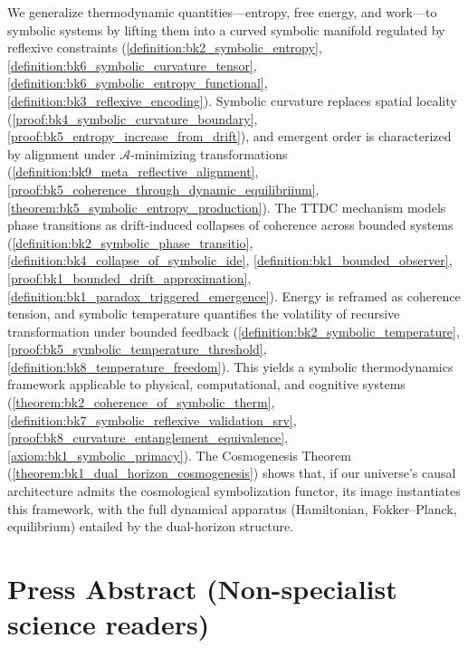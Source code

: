 We generalize thermodynamic quantities—entropy, free energy, and work—to symbolic systems by lifting them into a curved symbolic manifold regulated by reflexive constraints (\ref{definition:bk2_symbolic_entropy}, \ref{definition:bk6_symbolic_curvature_tensor}, \ref{definition:bk6_symbolic_entropy_functional}, \ref{definition:bk3_reflexive_encoding}). Symbolic curvature replaces spatial locality (\ref{proof:bk4_symbolic_curvature_boundary}, \ref{proof:bk5_entropy_increase_from_drift}), and emergent order is characterized by alignment under $\mathcal{A}$-minimizing transformations (\ref{definition:bk9_meta_reflective_alignment}, \ref{proof:bk5_coherence_through_dynamic_equilibriium}, \ref{theorem:bk5_symbolic_entropy_production}). The TTDC mechanism models phase transitions as drift-induced collapses of coherence across bounded systems (\ref{definition:bk2_symbolic_phase_transitio}, \ref{definition:bk4_collapse_of_symbolic_ide}, \ref{definition:bk1_bounded_observer}, \ref{proof:bk1_bounded_drift_approximation}, \ref{definition:bk1_paradox_triggered_emergence}). Energy is reframed as coherence tension, and symbolic temperature quantifies the volatility of recursive transformation under bounded feedback (\ref{definition:bk2_symbolic_temperature}, \ref{proof:bk5_symbolic_temperature_threshold}, \ref{definition:bk8_temperature_freedom}). This yields a symbolic thermodynamics framework applicable to physical, computational, and cognitive systems (\ref{theorem:bk2_coherence_of_symbolic_therm}, \ref{definition:bk7_symbolic_reflexive_validation_srv}, \ref{proof:bk8_curvature_entanglement_equivalence}, \ref{axiom:bk1_symbolic_primacy}). The Cosmogenesis Theorem (\ref{theorem:bk1_dual_horizon_cosmogenesis}) shows that, if our universe's causal architecture admits the cosmological symbolization functor, its image instantiates this framework, with the full dynamical apparatus (Hamiltonian, Fokker--Planck, equilibrium) entailed by the dual-horizon structure.

\section*{Press Abstract (Non-specialist science readers)}
\label{abs:press}


